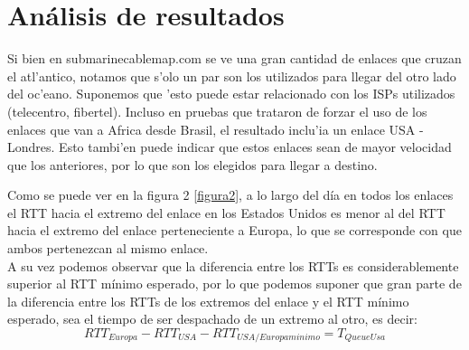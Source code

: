 \section{Análisis de resultados}

Si bien en submarinecablemap.com se ve una gran cantidad de enlaces que cruzan el atl'antico, notamos que s'olo un par son los utilizados para llegar del otro lado del oc'eano. Suponemos que 'esto puede estar relacionado con los ISPs utilizados (telecentro, fibertel). Incluso en pruebas que trataron de forzar el uso de los enlaces que van a Africa desde Brasil, el resultado inclu'ia un enlace USA - Londres. Esto tambi'en puede indicar que estos enlaces sean de mayor velocidad que los anteriores, por lo que son los elegidos para llegar a destino.

Como se puede ver en la figura 2 \ref{figura2}, a lo largo del día en todos los enlaces el RTT hacia el extremo del enlace en los Estados Unidos es menor al del RTT hacia el extremo del enlace perteneciente a Europa, lo que se corresponde con que ambos pertenezcan al mismo enlace.	\\
A su vez podemos observar que la diferencia entre los RTTs es considerablemente superior al RTT mínimo esperado, por lo que podemos suponer que gran parte de la diferencia entre los RTTs de los extremos del enlace y el RTT mínimo esperado, sea el tiempo de ser despachado de un extremo al otro, es decir:	\\
\begin{displaymath}
   RTT_{Europa} - RTT_{USA} - RTT_{USA/Europa minimo} = T_{Queue Usa}
\end{displaymath}
